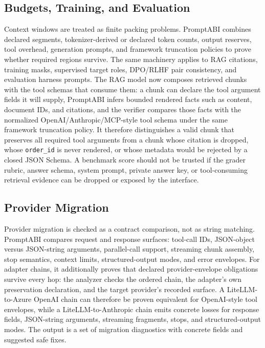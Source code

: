 \documentclass[10pt]{article}
\begin{document}
\subsection{Budgets, Training, and Evaluation}

Context windows are treated as finite packing problems. PromptABI combines
declared segments, tokenizer-derived or declared token counts, output reserves,
tool overhead, generation prompts, and framework truncation policies to prove
whether required regions survive. The same machinery applies to RAG citations,
training masks, supervised target roles, DPO/RLHF pair consistency, and
evaluation harness prompts. The RAG model now composes retrieved chunks with the
tool schemas that consume them: a chunk can declare the tool argument fields it
will supply, PromptABI infers bounded rendered facts such as content, document
IDs, and citations, and the verifier compares those facts with the normalized
OpenAI/Anthropic/MCP-style tool schema under the same framework truncation
policy. It therefore distinguishes a valid chunk that preserves all required
tool arguments from a chunk whose citation is dropped, whose \texttt{order\_id}
is never rendered, or whose metadata would be rejected by a closed JSON Schema.
A benchmark score should not be trusted if the grader rubric, answer schema,
system prompt, private answer key, or tool-consuming retrieval evidence can be
dropped or exposed by the interface.

\subsection{Provider Migration}

Provider migration is checked as a contract comparison, not as string matching.
PromptABI compares request and response surfaces: tool-call IDs, JSON-object
versus JSON-string arguments, parallel-call support, streaming chunk assembly,
stop semantics, context limits, structured-output modes, and error envelopes.
For adapter chains, it additionally proves that declared provider-envelope
obligations survive every hop: the analyzer checks the ordered chain, the
adapter's own preservation declaration, and the target provider's recorded
surface. A LiteLLM-to-Azure OpenAI chain can therefore be proven equivalent for
OpenAI-style tool envelopes, while a LiteLLM-to-Anthropic chain emits concrete
losses for response fields, JSON-string arguments, streaming fragments, stops,
and structured-output modes. The output is a set of migration diagnostics with
concrete fields and suggested safe fixes.
\end{document}
